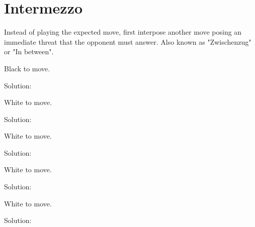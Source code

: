 \documentclass{book}
\begin{document}
\section{Intermezzo}
Instead of playing the expected move, first interpose another move posing an immediate threat that the opponent must answer. Also known as "Zwischenzug" or "In between".\begin{multicols}{2} 
\begin{samepage} 
\newgame 


 
\showboard
 
 Black to move. 
 
Solution: 
 
\end{samepage}\begin{samepage} 
\newgame 


 
\showboard
 
 White to move. 
 
Solution: 
 
\end{samepage}\begin{samepage} 
\newgame 


 
\showboard
 
 White to move. 
 
Solution: 
 
\end{samepage}\begin{samepage} 
\newgame 


 
\showboard
 
 White to move. 
 
Solution: 
 
\end{samepage}\begin{samepage} 
\newgame 


 
\showboard
 
 White to move. 
 
Solution: 
 
\end{samepage}\end{multicols} 
\newpage 
\end{document}

